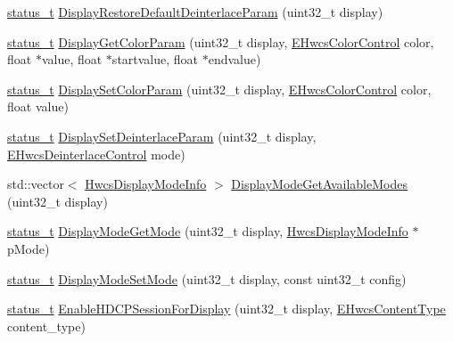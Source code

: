 \begin{DoxyCompactItemize}
\item 
\mbox{\hyperlink{hwcserviceapi_8h_a3806fb2027d9a316d8ca8d9b8b8eb96f}{status\+\_\+t}} \mbox{\hyperlink{classandroid_1_1HwcService_1_1Controls_a25d328152f7bc1f79dd5f06b9b59c24d}{Display\+Restore\+Default\+Deinterlace\+Param}} (uint32\+\_\+t display)
\item 
\mbox{\hyperlink{hwcserviceapi_8h_a3806fb2027d9a316d8ca8d9b8b8eb96f}{status\+\_\+t}} \mbox{\hyperlink{classandroid_1_1HwcService_1_1Controls_a949dc7e60f66edf99982523e53cb5691}{Display\+Get\+Color\+Param}} (uint32\+\_\+t display, \mbox{\hyperlink{hwcserviceapi_8h_a1d1cbf448ce748672cf3dd96675d70e4}{E\+Hwcs\+Color\+Control}} color, float $\ast$value, float $\ast$startvalue, float $\ast$endvalue)
\item 
\mbox{\hyperlink{hwcserviceapi_8h_a3806fb2027d9a316d8ca8d9b8b8eb96f}{status\+\_\+t}} \mbox{\hyperlink{classandroid_1_1HwcService_1_1Controls_a87f1656780eb437cefb9f398713af762}{Display\+Set\+Color\+Param}} (uint32\+\_\+t display, \mbox{\hyperlink{hwcserviceapi_8h_a1d1cbf448ce748672cf3dd96675d70e4}{E\+Hwcs\+Color\+Control}} color, float value)
\item 
\mbox{\hyperlink{hwcserviceapi_8h_a3806fb2027d9a316d8ca8d9b8b8eb96f}{status\+\_\+t}} \mbox{\hyperlink{classandroid_1_1HwcService_1_1Controls_adb0bdb522323be0ea0122464227459ef}{Display\+Set\+Deinterlace\+Param}} (uint32\+\_\+t display, \mbox{\hyperlink{hwcserviceapi_8h_a8473f2ec9e7333e67be46a1bea689113}{E\+Hwcs\+Deinterlace\+Control}} mode)
\item 
std\+::vector$<$ \mbox{\hyperlink{hwcserviceapi_8h_a6e13f5285374b86aab82ec0c0ba62d7a}{Hwcs\+Display\+Mode\+Info}} $>$ \mbox{\hyperlink{classandroid_1_1HwcService_1_1Controls_aae5310df10b584ddb537266bcb9399b5}{Display\+Mode\+Get\+Available\+Modes}} (uint32\+\_\+t display)
\item 
\mbox{\hyperlink{hwcserviceapi_8h_a3806fb2027d9a316d8ca8d9b8b8eb96f}{status\+\_\+t}} \mbox{\hyperlink{classandroid_1_1HwcService_1_1Controls_a359b41bbda3b6b5507dd23436cdca678}{Display\+Mode\+Get\+Mode}} (uint32\+\_\+t display, \mbox{\hyperlink{hwcserviceapi_8h_a6e13f5285374b86aab82ec0c0ba62d7a}{Hwcs\+Display\+Mode\+Info}} $\ast$p\+Mode)
\item 
\mbox{\hyperlink{hwcserviceapi_8h_a3806fb2027d9a316d8ca8d9b8b8eb96f}{status\+\_\+t}} \mbox{\hyperlink{classandroid_1_1HwcService_1_1Controls_a93a09106cc484a459e73b0d250937509}{Display\+Mode\+Set\+Mode}} (uint32\+\_\+t display, const uint32\+\_\+t config)
\item 
\mbox{\hyperlink{hwcserviceapi_8h_a3806fb2027d9a316d8ca8d9b8b8eb96f}{status\+\_\+t}} \mbox{\hyperlink{classandroid_1_1HwcService_1_1Controls_a142e297708c613277cb7721c040b0a77}{Enable\+H\+D\+C\+P\+Session\+For\+Display}} (uint32\+\_\+t display, \mbox{\hyperlink{hwcserviceapi_8h_a69e9b3a54e4c8e504845398c66eab655}{E\+Hwcs\+Content\+Type}} content\+\_\+type)

\end{DoxyCompactItemize}
